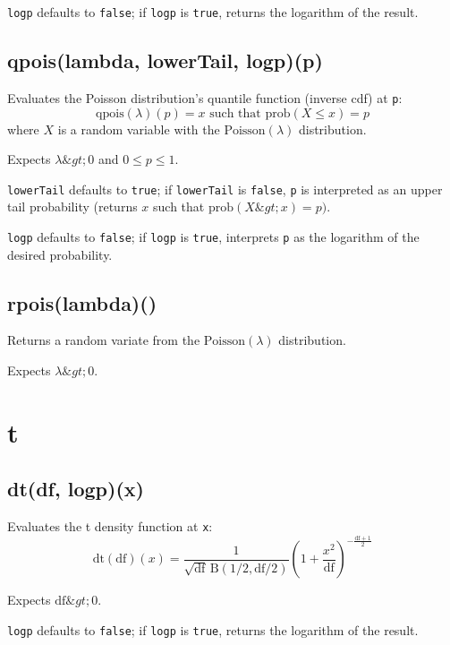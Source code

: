 \documentclass{article}
\begin{document}
\texttt{logp} defaults to \texttt{false}; if \texttt{logp} is \texttt{true}, returns the logarithm
of the result.


    \subsection*{qpois(lambda, lowerTail, logp)(p)}
    Evaluates the Poisson distribution's quantile function
(inverse cdf) at \texttt{p}:
$$\textrm{qpois}(\lambda)(p) = x \textrm{ such that } \textrm{prob}(X \leq x) = p$$
where $X$ is a random variable with the $\textrm{Poisson}(\lambda)$ distribution.


Expects $\lambda \&gt; 0$ and $0 \leq p \leq 1$.


\texttt{lowerTail} defaults to \texttt{true}; if \texttt{lowerTail} is \texttt{false}, \texttt{p} is
interpreted as an upper tail probability (returns
$x$ such that $\textrm{prob}(X \&gt; x) = p)$.


\texttt{logp} defaults to \texttt{false}; if \texttt{logp} is \texttt{true}, interprets \texttt{p} as
the logarithm of the desired probability.


    \subsection*{rpois(lambda)()}
    Returns a random variate from the $\textrm{Poisson}(\lambda)$ distribution.


Expects $\lambda \&gt; 0$.


  \section{t}
    \subsection*{dt(df, logp)(x)}
    Evaluates the t density function at \texttt{x}:
$$\textrm{dt}(\textrm{df})(x) = \frac{1}{\sqrt{\textrm{df}}\,\textrm{B}(1/2, \textrm{df}/2)} \left(1+\frac{x^2}{\textrm{df}} \right)^{-\frac{\textrm{df} + 1}{2}}$$


Expects $\textrm{df} \&gt; 0$.


\texttt{logp} defaults to \texttt{false}; if \texttt{logp} is \texttt{true}, returns the
logarithm of the result.
\end{document}
